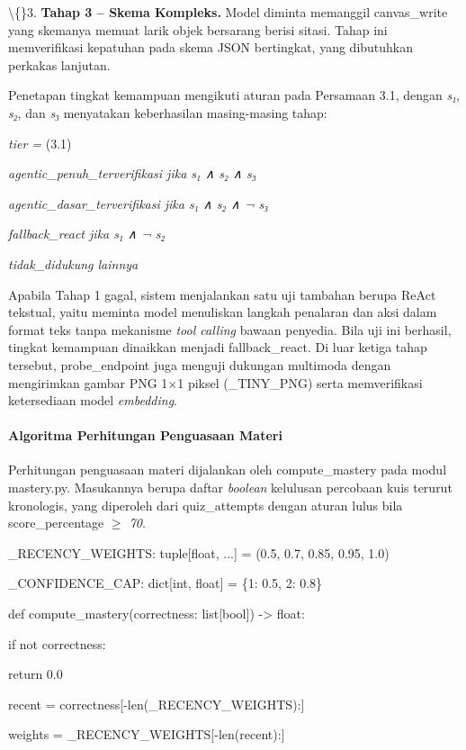 \documentclass[12pt,a4paper]{article}
\begin{document}
\textbackslash\{\}3. \textbf{Tahap 3 -- Skema Kompleks.} Model diminta memanggil canvas\_write yang skemanya memuat larik objek bersarang berisi sitasi. Tahap ini memverifikasi kepatuhan pada skema JSON bertingkat, yang dibutuhkan perkakas lanjutan.

Penetapan tingkat kemampuan mengikuti aturan pada Persamaan 3.1, dengan \textit{s₁}, \textit{s₂}, dan \textit{s₃} menyatakan keberhasilan masing-masing tahap:

\textit{tier =}	(3.1)

\textit{agentic\_penuh\_terverifikasi   jika s₁ ∧ s₂ ∧ s₃}

\textit{agentic\_dasar\_terverifikasi   jika s₁ ∧ s₂ ∧ ¬ s₃}

\textit{fallback\_react   jika s₁ ∧ ¬ s₂}

\textit{tidak\_didukung   lainnya}

Apabila Tahap 1 gagal, sistem menjalankan satu uji tambahan berupa ReAct tekstual, yaitu meminta model menuliskan langkah penalaran dan aksi dalam format teks tanpa mekanisme \textit{tool calling} bawaan penyedia. Bila uji ini berhasil, tingkat kemampuan dinaikkan menjadi fallback\_react. Di luar ketiga tahap tersebut, probe\_endpoint juga menguji dukungan multimoda dengan mengirimkan gambar PNG 1\textit{$\times$}1 piksel (\_TINY\_PNG) serta memverifikasi ketersediaan model \textit{embedding}.

\paragraph*{Algoritma Perhitungan Penguasaan Materi}
Perhitungan penguasaan materi dijalankan oleh compute\_mastery pada modul mastery.py. Masukannya berupa daftar \textit{boolean} kelulusan percobaan kuis terurut kronologis, yang diperoleh dari quiz\_attempts dengan aturan lulus bila score\_percentage \textit{$\ge$ 70}.

\_RECENCY\_WEIGHTS: tuple{[}float, ...{]} = (0.5, 0.7, 0.85, 0.95, 1.0)

\_CONFIDENCE\_CAP: dict{[}int, float{]} = \{1: 0.5, 2: 0.8\}

def compute\_mastery(correctness: list{[}bool{]}) -\textgreater{} float:

if not correctness:

return 0.0

recent = correctness{[}-len(\_RECENCY\_WEIGHTS):{]}

weights = \_RECENCY\_WEIGHTS{[}-len(recent):{]}
\end{document}
